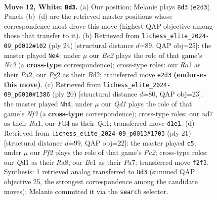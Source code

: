 \documentclass[11pt]{article}
\begin{document}
\begin{figure}[p]
\label{fig:thought-m20}
\end{figure}

\clearpage

\begin{figure}[p]\centering
\begin{subfigure}{0.46\textwidth}\centering
\resizebox{\linewidth}{!}{%
\newchessgame
\chessboard[
  setfen={r1bqk2r/p2n1ppp/2pbpn2/8/Np1P3N/4P3/PP2BPPP/R1BQ1RK1 w - - 4 12},
  showmover=false,
  pgfstyle=straightmove, color=movearrow, markmove={e2-d3}
]}
\caption{}
\end{subfigure}\hfill
\begin{subfigure}{0.46\textwidth}\centering
\resizebox{\linewidth}{!}{%
\newchessgame
\chessboard[
  setfen={2kr1b1r/ppqn1pp1/2p1pn2/7p/2BP3P/2N2P1R/PPPBQ1P1/2KR4 w - - 1 13},
  showmover=false,
  pgfstyle=straightmove, color=movearrow, markmove={c3-e4}
]}
\caption{}
\end{subfigure}
\\[4pt]
\begin{subfigure}{0.46\textwidth}\centering
\resizebox{\linewidth}{!}{%
\newchessgame
\chessboard[
  setfen={r2qk2r/pp1nbppp/2p1pn2/5b2/3P1B2/2N2NPP/PPP2PB1/R2Q1RK1 w kq - 1 11},
  showmover=false,
  pgfstyle=straightmove, color=movearrow, markmove={f3-h4}
]}
\caption{}
\end{subfigure}\hfill
\begin{subfigure}{0.46\textwidth}\centering
\resizebox{\linewidth}{!}{%
\newchessgame
\chessboard[
  setfen={rnbr2k1/pppqbppp/4n3/3pP3/8/2P2N2/PPBN1PPP/R1BQR1K1 b - - 6 11},
  showmover=false,
  pgfstyle=straightmove, color=movearrow, markmove={c7-c5}
]}
\caption{}
\end{subfigure}
\caption{\textbf{Move 12, White: \texttt{Bd3}.} (a) Our position; Melanie plays \texttt{Bd3} (\texttt{e2d3}). Panels (b)--(d) are the retrieved master positions whose correspondence most drove this move (highest QAP objective among those that transfer to it). (b) Retrieved from \texttt{lichess\_elite\_2024-09\_p0012\#102} (ply 24) [structural distance $d$=89, QAP obj=25]: the master played \texttt{Ne4}; under $\mu$ our \emph{Be2} plays the role of that game's \emph{Nc3} (a \textbf{cross-type} correspondence); cross-type roles: our \emph{R}a1 as their \emph{P}a2, our \emph{P}g2 as their \emph{B}d2; transferred move \texttt{e2d3} \textbf{(endorses this move)}. (c) Retrieved from \texttt{lichess\_elite\_2024-09\_p0010\#1386} (ply 20) [structural distance $d$=80, QAP obj=23]: the master played \texttt{Nh4}; under $\mu$ our \emph{Qd1} plays the role of that game's \emph{Nf3} (a \textbf{cross-type} correspondence); cross-type roles: our \emph{n}d7 as their \emph{R}a1, our \emph{P}d4 as their \emph{Q}d1; transferred move \texttt{d1e1}. (d) Retrieved from \texttt{lichess\_elite\_2024-09\_p0013\#1703} (ply 21) [structural distance $d$=99, QAP obj=22]: the master played \texttt{c5}; under $\mu$ our \emph{Pf2} plays the role of that game's \emph{Pc2}; cross-type roles: our \emph{Q}d1 as their \emph{R}a8, our \emph{B}c1 as their \emph{P}a7; transferred move \texttt{f2f3}. Synthesis: 1 retrieved analog transferred to \texttt{Bd3} (summed QAP objective 25, the strongest correspondence among the candidate moves); Melanie committed it via the \texttt{search} selector.}

\end{figure}
\end{document}
